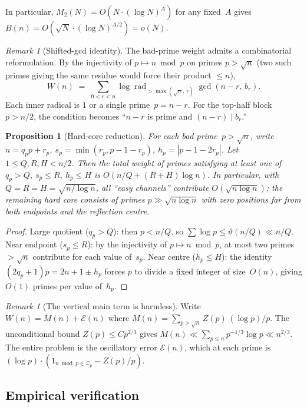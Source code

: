 \documentclass[11pt]{article}
\newtheorem{proposition}[theorem]{Proposition}
\theoremstyle{definition}
\theoremstyle{remark}
\newtheorem{remark}[theorem]{Remark}
\begin{document}
In particular, $M_2(N) = O(N\cdot(\log N)^A)$ for any fixed~$A$
gives $B(n) = O(\sqrt{N}\cdot (\log N)^{A/2}) = o(N)$.

\begin{remark}[Shifted-gcd identity]
The bad-prime weight admits a combinatorial reformulation.
By the injectivity of $p \mapsto n \bmod p$ on primes
$p > \sqrt{n}$ (two such primes giving the same residue
would force their product $\le n$),
\[
  W(n) \;=\; \sum_{0 < r < n}
  \log\operatorname{rad}_{> \max(\sqrt{n},\,r)}
  \gcd(n - r,\, b_r).
\]
Each inner radical is $1$ or a single prime~$p = n - r$.
For the top-half block $p > n/2$, the condition becomes
``$n - r$ is prime and $(n-r) \mid b_r$.''
\end{remark}

\begin{proposition}[Hard-core reduction]\label{prop:hard-core}
For each bad prime~$p > \sqrt{n}$, write
$n = q_p p + r_p$, $s_p = \min(r_p, p{-}1{-}r_p)$,
$h_p = |p{-}1{-}2r_p|$.
Let $1 \le Q, R, H < n/2$.
Then the total weight of primes satisfying at least one of
$q_p > Q$, $s_p \le R$, $h_p \le H$ is
$O(n/Q + (R+H)\log n)$.
In particular, with $Q = R = H = \sqrt{n/\log n}$,
all ``easy channels'' contribute $O(\sqrt{n\log n})$;
the remaining hard core consists of primes
$p \gg \sqrt{n\log n}$ with zero positions
far from both endpoints and the reflection centre.
\end{proposition}

\begin{proof}
Large quotient ($q_p > Q$): then $p < n/Q$,
so $\sum \log p \le \vartheta(n/Q) \ll n/Q$.
Near endpoint ($s_p \le R$): by the injectivity
of $p \mapsto n \bmod p$, at most two primes
$> \sqrt{n}$ contribute for each value of~$s_p$.
Near centre ($h_p \le H$): the identity
$(2q_p+1)p = 2n+1 \pm h_p$ forces $p$
to divide a fixed integer of size~$O(n)$,
giving $O(1)$ primes per value of~$h_p$.
\end{proof}

\begin{remark}[The vertical main term is harmless]
\label{rem:vertical-main}
Write $W(n) = M(n) + \mathcal{E}(n)$ where
$M(n) = \sum_{p > \sqrt{n}} Z(p)\,(\log p)/p$.
The unconditional bound $Z(p) \le Cp^{2/3}$ gives
$M(n) \ll \sum_{p \le n} p^{-1/3}\!\log p \ll n^{2/3}$.
The entire problem is the oscillatory error
$\mathcal{E}(n)$, which at each prime is
$(\log p)\cdot(1_{n \bmod p \in \mathcal{Z}_p} - Z(p)/p)$.
\end{remark}

\subsection{Empirical verification}
\end{document}
